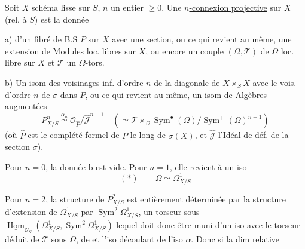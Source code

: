 Soit $X$ schéma lisse sur $S$,  $n$ un entier $\geq0$. Une \uline{$n$-connexion projective} sur $X$ (rel. à $S$) est la donnée

 a) d'un fibré de B.S $P$ sur $X$ avec une section, ou ce qui revient au même, une extension
de Modules loc. libres sur $X$, ou encore un couple $(\Omega,\mathcal{T})$ de $\Omega$ loc. libre sur $X$ et $\mathcal{T}$ un $\Omega$-tors.

 b) Un isom des voisinages inf. d'ordre $n$ de la diagonale de $X\times_S X$ avec le vois. d'ordre $n$ de $\sigma$ dans $P$, ou ce qui revient au même, un isom de Algèbres augmentées
\[
P^n_{X/S}\overset{\alpha_n}{\simeq}\mathcal{O}_{\widehat P}/\widehat{\mathcal{J}}^{n+1}
\quad(\simeq\mathcal{T}\times_{\Omega}\operatorname{Sym}^{\bullet}(\Omega)/\operatorname{Sym}^{+}(\Omega)^{n+1})
\]
(où $\widehat P$ est le complété formel de $P$ le long de $\sigma(X)$, et $\widehat{\mathcal{J}}$ l'Idéal de déf. de la section $\sigma$).

Pour $n=0$, la donnée b est vide. Pour $n=1$, elle revient à un iso
\[
(*)\qquad\Omega\simeq\Omega^1_{X/S}
\]

Pour $n=2$, la structure de $P^2_{X/S}$ est entièrement déterminée par la structure d'extension de $\Omega^1_{X/S}$ par $\operatorname{Sym}^2\Omega^1_{X/S}$,    un torseur sous $\underline{\operatorname{Hom}}_{\mathcal{O}_S}(\Omega^1_{X/S},\operatorname{Sym}^2\Omega^1_{X/S})$ lequel doit donc être muni d'un iso avec le torseur déduit de $\mathcal{T}$ sous $\Omega$, de
et l'iso découlant de l'iso $\alpha$. Donc si la dim relative
